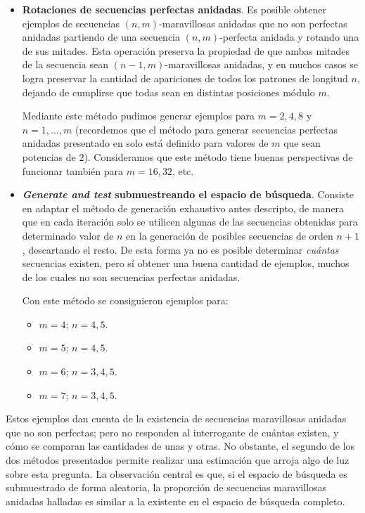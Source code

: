 \begin{itemize}
	\item \textbf{Rotaciones de secuencias perfectas anidadas}. Es posible obtener ejemplos
	de secuencias $(n,m)$-maravillosas anidadas que no son perfectas anidadas
	partiendo de una secuencia $(n,m)$-perfecta anidada y rotando una de sus
	mitades. Esta operación preserva la propiedad de que ambas mitades de la
	secuencia sean $(n-1,m)$-maravillosas anidadas, y en muchos casos se logra
	preservar la cantidad de apariciones de todos los patrones de longitud $n$,
	dejando de cumplirse que todas sean en distintas posiciones módulo $m$.

	Mediante este método pudimos generar ejemplos para $m = 2, 4, 8$ y
	$n = 1, \dots, m$ (recordemos que el método para generar secuencias perfectas
	anidadas presentado en \cite{becher-nested-perfect} solo está definido para valores
	de $m$ que sean potencias de $2$). Consideramos que este método tiene buenas
	perspectivas de funcionar también para $m = 16, 32$, etc.


	\item \textbf{\emph{Generate and test} submuestreando el espacio de búsqueda}.
	Consiste en adaptar el método de generación exhaustivo antes descripto, de
	manera que en cada iteración solo se utilicen algunas de las secuencias
	obtenidas para determinado valor de $n$ en la generación de posibles
	secuencias de orden $n + 1$, descartando el resto. De esta forma ya no es
	posible determinar \emph{cuántas} secuencias existen, pero sí obtener una
	buena cantidad de ejemplos, muchos de los cuales no son secuencias perfectas
	anidadas.

	Con este método se consiguieron ejemplos para:
	\begin{itemize}
		\item $m = 4$; $n = 4, 5$.
		\item $m = 5$; $n = 4, 5$.
		\item $m = 6$; $n = 3, 4, 5$.
		\item $m = 7$; $n = 3, 4, 5$.
	\end{itemize}

\end{itemize}

Estos ejemplos dan cuenta de la existencia de secuencias maravillosas anidadas
que no son perfectas; pero no responden al interrogante de cuántas
existen, y cómo se comparan las cantidades de unas y otras.
No obstante, el segundo de los dos métodos presentados permite realizar una
estimación que arroja algo de luz sobre esta pregunta. La observación central
es que, si el espacio de búsqueda es submuestrado de forma aleatoria,
la proporción de secuencias maravillosas anidadas halladas es similar
a la existente en el espacio de búsqueda completo.

